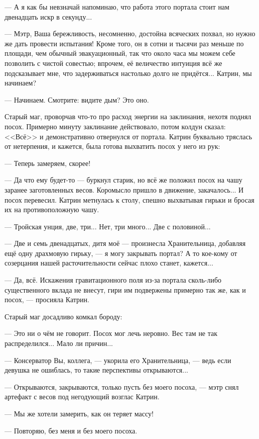 --- А я как бы невзначай напоминаю, что работа этого портала стоит нам двенадцать искр в секунду...

--- Мэтр, Ваша бережливость, несомненно, достойна всяческих похвал, но нужно же дать провести испытания!
Кроме того, он в сотни и тысячи раз меньше по площади, чем обычный эвакуационный,
так что около часа мы можем себе позволить с чистой совестью; впрочем, её величество интуиция всё же подсказывает мне,
что задерживаться настолько долго не придётся... Катрин, мы начинаем?

--- Начинаем. Смотрите: видите дым? Это оно.

Старый маг, проворчав что-то про расход энергии на заклинания, нехотя поднял посох.
Примерно минуту заклинание действовало, потом колдун сказал: <<Всё>> и демонстративно отвернулся от портала.
Катрин буквально тряслась от нетерпения, и кажется, была готова выхватить посох у него из рук:

--- Теперь замеряем, скорее!

--- Да что ему будет-то --- буркнул старик, но всё же положил посох на чашу заранее заготовленных весов.
Коромысло пришло в движение, закачалось... И посох перевесил.
Катрин метнулась к столу, спешно выхватывая гирьки и бросая их на противоположную чашу.

--- Тройская унция, две, три... Нет, три много... Две с половиной...

--- Две и семь двенадцатых, дитя моё --- произнесла Хранительница, добавляя ещё одну драхмовую гирьку,
--- я могу закрывать портал? А то кое-кому от созерцания нашей расточительности сейчас плохо станет, кажется...

--- Да, всё. Искажения гравитационного поля из-за портала сколь-либо существенного вклада не внесут,
гири им подвержены примерно так же, как и посох, --- просияла Катрин.

Старый маг досадливо комкал бороду:

--- Это ни о чём не говорит. Посох мог лечь неровно. Вес там не так распределился... Мало ли причин...

--- Консерватор Вы, коллега, --- укорила его Хранительница,
--- ведь если девушка не ошиблась, то такие перспективы открываются...

--- Открываются, закрываются, только пусть без моего посоха,
--- мэтр снял артефакт с весов под негодующий возглас Катрин.

--- Мы же хотели замерить, как он теряет массу!

--- Повторяю, без меня и без моего посоха.

